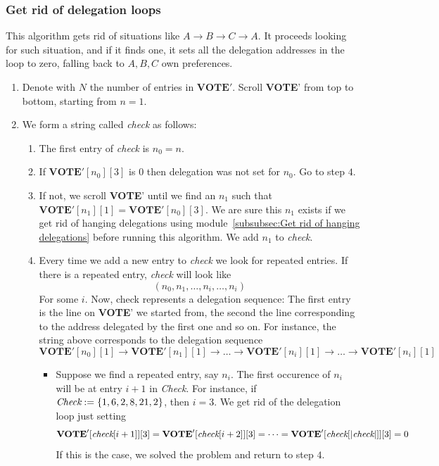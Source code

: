 \documentclass[submission, copyright,creativecommons,sharealike,noncommercial]{eptcs}
\newcommand{\Vote}{\textbf{VOTE}\xspace}
\begin{document}
\subsubsection{Get rid of delegation loops}\label{subsubsec:Get rid of delegation loops}
	This algorithm gets rid of situations like $A \to B \to C \to A$. It proceeds looking for such situation, and if it finds one, it sets all the delegation addresses in the loop to zero, falling back to $A,B,C$ own preferences.
	\begin{enumerate}
		\item Denote with $N$ the number of entries in $\Vote'$. Scroll \Vote' from top to bottom, starting from $n=1$.
		\item We form a string called \emph{check} as follows:
		\begin{enumerate}
			\item The first entry of \emph{check} is $n_0=n$.
			
			\item If $\Vote'[n_0][3]$ is $0$ then delegation was not set for $n_0$. Go to step $4$.

			\item If not, we scroll \Vote' until we find an $n_1$ such that $\Vote'[n_1][1] = \Vote'[n_0][3]$. We are sure this $n_1$ exists if we get rid of hanging delegations using module~\ref{subsubsec:Get rid of hanging delegations} before running this algorithm. We add $n_1$ to \emph{check}.
			
			\item Every time we add a new entry to \emph{check} we look for repeated entries. If there is a repeated entry, \emph{check} will look like
			\[
			(n_0,n_1,\dots, n_i, \dots, n_i)
			\]
			For some $i$. Now, check represents a delegation sequence: The first entry is the line on \Vote' we started from, the second the line corresponding to the address delegated by the first one and so on. For instance, the string above corresponds to the delegation sequence
			\[
			\Vote'[n_0][1] \to \Vote'[n_1][1] \to \dots \to \Vote'[n_i][1] \to \dots \to \Vote'[n_i][1]
			\]
			\begin{itemize}
				\item Suppose we find a repeated entry, say $n_i$. The first occurence of $n_i$ will be at entry $i+1$ in \emph{Check}. For instance, if $\emph{Check}:=\{1,6,2,8,21,2\}$, then $i=3$. We get rid of the delegation loop just setting 
				\[
				\Vote'[\emph{check}[i+1]][3]=\Vote'[\emph{check}[i+2]][3] = \dots = \Vote'[\emph{check}[|\emph{check}|]][3]=0
				\]
				If this is the case, we solved the problem and return to step $4$.
			

\end{itemize}
\end{enumerate}
\end{enumerate}
\end{document}

